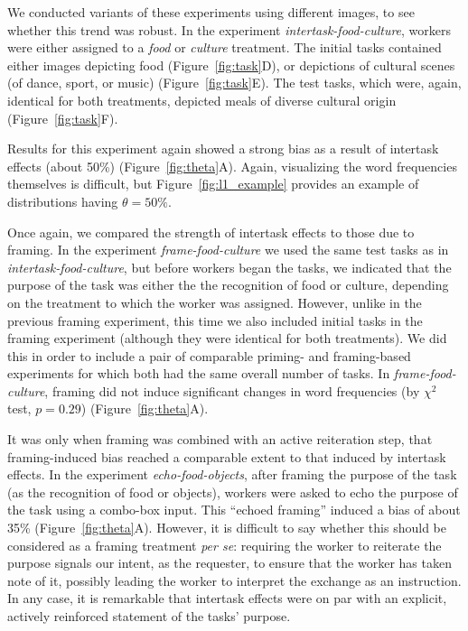 \documentclass{sigchi}
\begin{document}
We conducted variants of these experiments using different images, to see 
whether this trend was robust.  In the experiment 
\textit{intertask-food-culture},
workers were either assigned to a \textit{food} or \textit{culture} treatment.
The initial tasks contained either images 
depicting food (Figure~\ref{fig:task}D), or depictions of cultural scenes 
(of dance, sport, or music) (Figure~\ref{fig:task}E).  The test tasks, 
which 
were, again, identical for both treatments, depicted meals of diverse 
cultural origin
(Figure~\ref{fig:task}F).  

Results for this experiment again showed a 
strong bias as a result of intertask effects (about 50\%) 
(Figure~\ref{fig:theta}A).  Again, visualizing the word frequencies 
themselves is difficult, but Figure~\ref{fig:l1_example} provides an 
example of distributions having $\theta = 50\%$.

Once again, we compared the strength of intertask effects to those due to 
framing. In the experiment \textit{frame-food-culture} we used
the same test tasks as in \textit{intertask-food-culture}, but before
workers began the tasks, we indicated
that the purpose of the task was either the the recognition of food or 
culture, depending on the treatment to which the worker was assigned.  
However, unlike in the previous framing experiment, this time we also 
included initial tasks in the framing experiment (although they were 
identical for both treatments).  We did this in order to include a pair of
comparable priming- and framing-based experiments
for which both had the same overall number of tasks.
In \textit{frame-food-culture}, framing did not induce 
significant changes in word frequencies 
(by $\chi^2$ test, $p=0.29$) (Figure~\ref{fig:theta}A).

It was only when framing was combined with an active reiteration step, 
that framing-induced bias reached a comparable extent to that induced by 
intertask effects.  In the experiment \textit{echo-food-objects},
after framing the purpose of the task (as the recognition of food
or objects), workers were asked to echo the purpose of the task
using a combo-box input.  This  ``echoed framing'' induced a bias of about 
35\% (Figure~\ref{fig:theta}A). However, it is difficult to say whether this 
should be considered as a framing treatment \textit{per se}:
requiring the worker to reiterate the purpose signals our intent, as the 
requester, to ensure that the worker has taken note of it, possibly leading 
the worker to interpret the exchange as an instruction.  
In any case, it is remarkable that intertask effects
were on par with an explicit, actively reinforced statement of the tasks' 
purpose.
\end{document}
